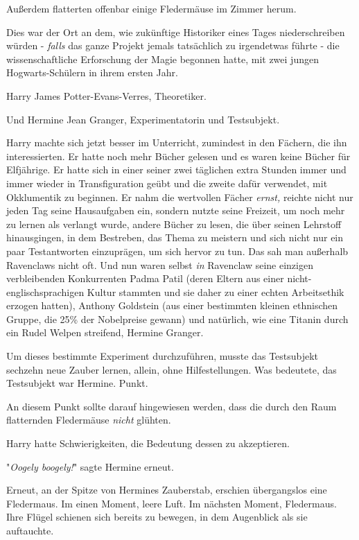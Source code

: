 {Außerdem flatterten offenbar einige Fledermäuse im Zimmer herum.

Dies war der Ort an dem, wie zukünftige Historiker eines Tages niederschreiben würden - \emph{falls} das ganze Projekt jemals tatsächlich zu irgendetwas führte - die wissenschaftliche Erforschung der Magie begonnen hatte, mit zwei jungen Hogwarts-Schülern in ihrem ersten Jahr.

Harry James Potter-Evans-Verres, Theoretiker.

Und Hermine Jean Granger, Experimentatorin und Testsubjekt.

Harry machte sich jetzt besser im Unterricht, zumindest in den Fächern, die ihn interessierten. Er hatte noch mehr Bücher gelesen und es waren keine Bücher für Elfjährige. Er hatte sich in einer seiner zwei täglichen extra Stunden immer und immer wieder in Transfiguration geübt und die zweite dafür verwendet, mit Okklumentik zu beginnen. Er nahm die wertvollen Fächer \emph{ernst,} reichte nicht nur jeden Tag seine Hausaufgaben ein, sondern nutzte seine Freizeit, um noch mehr zu lernen als verlangt wurde, andere Bücher zu lesen, die über seinen Lehrstoff hinausgingen, in dem Bestreben, das Thema zu meistern und sich nicht nur ein paar Testantworten einzuprägen, um sich hervor zu tun. Das sah man außerhalb Ravenclaws nicht oft. Und nun waren selbst \emph{in} Ravenclaw seine einzigen verbleibenden Konkurrenten Padma Patil (deren Eltern aus einer nicht-englischsprachigen Kultur stammten und sie daher zu einer echten Arbeitsethik erzogen hatten), Anthony Goldstein (aus einer bestimmten kleinen ethnischen Gruppe, die 25\% der Nobelpreise gewann) und natürlich, wie eine Titanin durch ein Rudel Welpen streifend, Hermine Granger.

Um dieses bestimmte Experiment durchzuführen, musste das Testsubjekt sechzehn neue Zauber lernen, allein, ohne Hilfestellungen. Was bedeutete, das Testsubjekt war Hermine. Punkt.

An diesem Punkt sollte darauf hingewiesen werden, dass die durch den Raum flatternden Fledermäuse \emph{nicht} glühten.

Harry hatte Schwierigkeiten, die Bedeutung dessen zu akzeptieren.

"\emph{Oogely boogely!}" sagte Hermine erneut.

Erneut, an der Spitze von Hermines Zauberstab, erschien übergangslos eine Fledermaus. Im einen Moment, leere Luft. Im nächsten Moment, Fledermaus. Ihre Flügel schienen sich bereits zu bewegen, in dem Augenblick als sie auftauchte.

}
